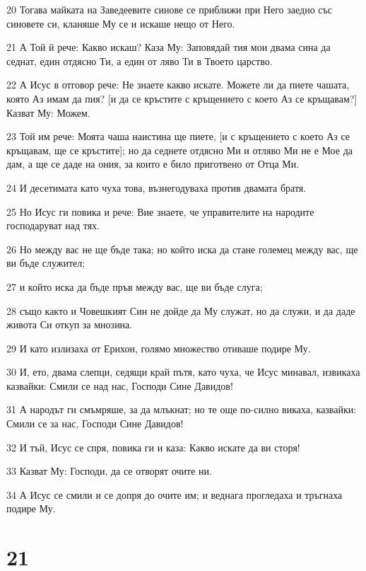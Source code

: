 \par 20 Тогава майката на Заведеевите синове се приближи при Него заедно със синовете си, кланяше Му се и искаше нещо от Него.
\par 21 А Той й рече: Какво искаш? Каза Му: Заповядай тия мои двама сина да седнат, един отдясно Ти, а един от ляво Ти в Твоето царство.
\par 22 А Исус в отговор рече: Не знаете какво искате. Можете ли да пиете чашата, която Аз имам да пия? [и да се кръстите с кръщението с което Аз се кръщавам?] Казват Му: Можем.
\par 23 Той им рече: Моята чаша наистина ще пиете, [и с кръщението с което Аз се кръщавам, ще се кръстите]; но да седнете отдясно Ми и отляво Ми не е Мое да дам, а ще се даде на ония, за които е било приготвено от Отца Ми.
\par 24 И десетимата като чуха това, възнегодуваха против двамата братя.
\par 25 Но Исус ги повика и рече: Вие знаете, че управителите на народите господаруват над тях.
\par 26 Но между вас не ще бъде така; но който иска да стане големец между вас, ще ви бъде служител;
\par 27 и който иска да бъде пръв между вас, ще ви бъде слуга;
\par 28 също както и Човешкият Син не дойде да Му служат, но да служи, и да даде живота Си откуп за мнозина.
\par 29 И като излизаха от Ерихон, голямо множество отиваше подире Му.
\par 30 И, ето, двама слепци, седящи край пътя, като чуха, че Исус минавал, извикаха казвайки: Смили се над нас, Господи Сине Давидов!
\par 31 А народът ги смъмряше, за да млъкнат; но те още по-силно викаха, казвайки: Смили се за нас, Господи Сине Давидов!
\par 32 И тъй, Исус се спря, повика ги и каза: Какво искате да ви сторя!
\par 33 Казват Му: Господи, да се отворят очите ни.
\par 34 А Исус се смили и се допря до очите им; и веднага прогледаха и тръгнаха подире Му.

\chapter{21}

